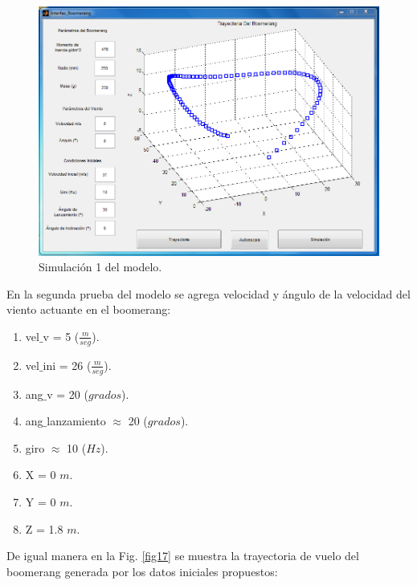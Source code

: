 		\begin{figure}[h]
		\begin{center}
		\includegraphics[scale=0.45]{imagenes/3-boomerang/tray_1.png}
		\caption{Simulación 1 del modelo.}
		\label{fig16}
		\end{center}
		\end{figure}


	En la segunda prueba del modelo se agrega velocidad y ángulo de la velocidad del viento actuante en el boomerang:

		\begin{enumerate}
		\item{vel$\_$v = 5 {($\frac{m}{seg}$)}.}
		\item{vel$\_$ini = 26 {($\frac{m}{seg}$)}.}
		\item{ang$\_$v = 20 {($grados$)}.}
  		\item{ang$\_$lanzamiento $\approx$ 20 {($grados$)}.}
		\item{giro $\approx$ 10 {($Hz$)}.}
     	\item{X = 0 $m$.}
     	\item{Y = 0 $m$.}
     	\item{Z = 1.8 $m$.}
		\end{enumerate}

	De igual manera en la Fig. \ref{fig17} se muestra la trayectoria de vuelo del boomerang generada por los datos iniciales propuestos:

